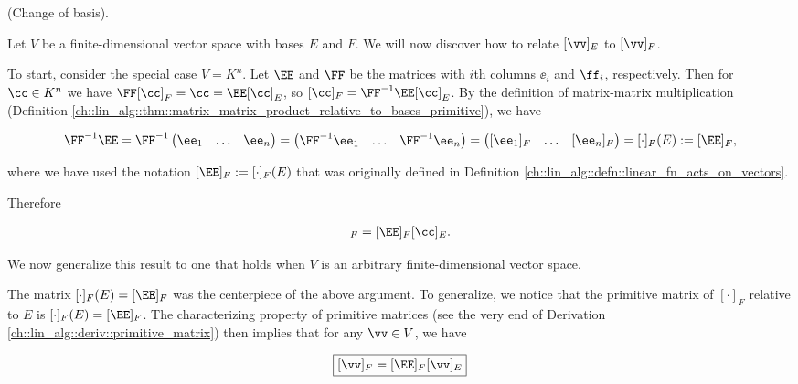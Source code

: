 \begin{theorem}
    \label{ch::lin_alg::thm::change_of_basis_for_vectors}
    
    (Change of basis).
    
    Let $V$ be a finite-dimensional vector space with bases $E$ and $F$. We will now discover how to relate $[\vv]_E$ to $[\vv]_F$.
    
    To start, consider the special case $V = K^n$. Let $\EE$ and $\FF$ be the matrices with $i$th columns $\ee_i$ and $\ff_i$, respectively. Then for $\cc \in K^n$ we have $\FF [\cc]_F = \cc = \EE [\cc]_E$, so $[\cc]_F = \FF^{-1} \EE [\cc]_E$. By the definition of matrix-matrix multiplication (Definition \ref{ch::lin_alg::thm::matrix_matrix_product_relative_to_bases_primitive}), we have
    
    \begin{align*}
        \FF^{-1} \EE = \FF^{-1} \begin{pmatrix} \ee_1 & \hdots & \ee_n \end{pmatrix} = \begin{pmatrix} \FF^{-1} \ee_1 & \hdots & \FF^{-1} \ee_n \end{pmatrix}
        = \begin{pmatrix} [\ee_1]_F & \hdots & [\ee_n]_F \end{pmatrix}
        = [\cdot]_F(E) := [\EE]_F,
    \end{align*}
    
    where we have used the notation $[\EE]_F := [\cdot]_F(E)$ that was originally defined in Definition \ref{ch::lin_alg::defn::linear_fn_acts_on_vectors}.
    
    Therefore
    
    \begin{align*}
        [\cc]_F = [\EE]_F [\cc]_E.
    \end{align*}
    
    We now generalize this result to one that holds when $V$ is an arbitrary finite-dimensional vector space.
    
    The matrix $[\cdot]_F(E) = [\EE]_F$ was the centerpiece of the above argument. To generalize, we notice that the primitive matrix of $[\cdot]_F$ relative to $E$ is $[\cdot]_F(E) = [\EE]_F$. The characterizing property of primitive matrices (see the very end of Derivation \ref{ch::lin_alg::deriv::primitive_matrix}) then implies that for any $\vv \in V$, we have
    
    \begin{align*}
        \boxed
        {
            [\vv]_F = [\EE]_F [\vv]_E
        }
    \end{align*}
    

\end{theorem}
